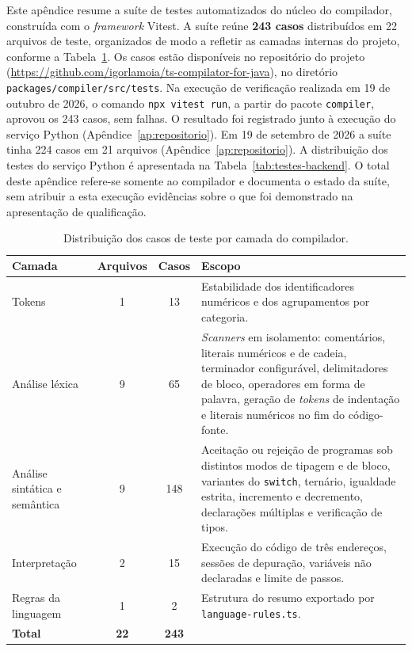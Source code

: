 Este apêndice resume a suíte de testes automatizados do núcleo do compilador, construída com o \textit{framework} Vitest. A suíte reúne \textbf{243 casos} distribuídos em 22 arquivos de teste, organizados de modo a refletir as camadas internas do projeto, conforme a Tabela~\ref{tab:testes-resumo}. Os casos estão disponíveis no repositório do projeto (\url{https://github.com/igorlamoia/ts-compilator-for-java}), no diretório \texttt{packages/compiler/src/tests}. Na execução de verificação realizada em 19 de outubro de 2026, o comando \texttt{npx vitest run}, a partir do pacote \texttt{compiler}, aprovou os 243 casos, sem falhas. O resultado foi registrado junto à execução do serviço Python (Apêndice~\ref{ap:repositorio}). Em 19 de setembro de 2026 a suíte tinha 224 casos em 21 arquivos (Apêndice~\ref{ap:repositorio}). A distribuição dos testes do serviço Python é apresentada na Tabela~\ref{tab:testes-backend}. O total deste apêndice refere-se somente ao compilador e documenta o estado da suíte, sem atribuir a esta execução evidências sobre o que foi demonstrado na apresentação de qualificação.

\begin{table}[H]
    \centering
    \caption{Distribuição dos casos de teste por camada do compilador.}
    \label{tab:testes-resumo}
    \begin{tabular}{|>{\raggedright\arraybackslash}p{3.4cm}|c|c|p{6.2cm}|}
        \hline
        \textbf{Camada} & \textbf{Arquivos} & \textbf{Casos} & \textbf{Escopo} \\
        \hline
        Tokens & 1 & 13 & Estabilidade dos identificadores numéricos e dos agrupamentos por categoria. \\
        \hline
        Análise léxica & 9 & 65 & \textit{Scanners} em isolamento: comentários, literais numéricos e de cadeia, terminador configurável, delimitadores de bloco, operadores em forma de palavra, geração de \textit{tokens} de indentação e literais numéricos no fim do código-fonte. \\
        \hline
        Análise sintática e semântica & 9 & 148 & Aceitação ou rejeição de programas sob distintos modos de tipagem e de bloco, variantes do \texttt{switch}, ternário, igualdade estrita, incremento e decremento, declarações múltiplas e verificação de tipos. \\
        \hline
        Interpretação & 2 & 15 & Execução do código de três endereços, sessões de depuração, variáveis não declaradas e limite de passos. \\
        \hline
        Regras da linguagem & 1 & 2 & Estrutura do resumo exportado por \texttt{language-rules.ts}. \\
        \hline
        \textbf{Total} & \textbf{22} & \textbf{243} & \\
        \hline
    \end{tabular}
\end{table}


